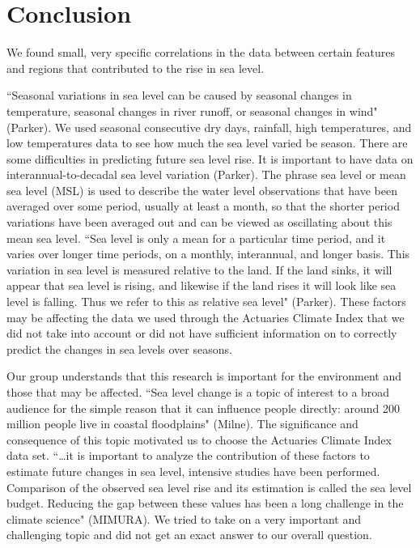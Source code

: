 \documentclass[12pt]{report}
\begin{document}
\section* {Conclusion}
\indent \par We found small, very specific correlations in the data between certain features and regions that contributed to the rise in sea level. 
\par \textquotedblleft Seasonal variations in sea level can be caused by seasonal changes in temperature, seasonal changes in river runoff, or seasonal changes in wind" (Parker). We used seasonal consecutive dry days, rainfall, high temperatures, and low temperatures data to see how much the sea level varied be season. There are some difficulties in predicting future sea level rise. It is important to have data on interannual-to-decadal sea level variation (Parker). The phrase sea level or mean sea level (MSL) is used to describe the water level observations that have been averaged over some period, usually at least a month, so that the shorter period variations have been averaged out and can be viewed as oscillating about this mean sea level. \textquotedblleft Sea level is only a mean for a particular time period, and it varies over longer time periods, on a monthly, interannual, and longer basis. This variation in sea level is measured relative to the land. If the land sinks, it will appear that sea level is rising, and likewise if the land rises it will look like sea level is falling. Thus we refer to this as relative sea level" (Parker). These factors may be affecting the data we used through the Actuaries Climate Index that we did not take into account or did not have sufficient information on to correctly predict the changes in sea levels over seasons. 
\par Our group understands that this research is important for the environment and those that may be affected. \textquotedblleft Sea level change is a topic of interest to a broad audience for the simple reason that it can influence people directly: around 200 million people live in coastal floodplains" (Milne). The significance and consequence of this topic motivated us to choose the Actuaries Climate Index data set. \textquotedblleft…it is important to analyze the contribution of these factors to estimate future changes in sea level, intensive studies have been performed. Comparison of the observed sea level rise and its estimation is called the sea level budget. Reducing the gap between these values has been a long challenge in the climate science" (MIMURA). We tried to take on a very important and challenging topic and did not get an exact answer to our overall question. 
\end{document}
